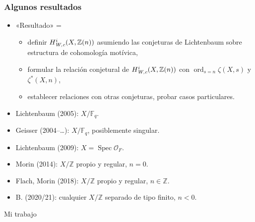\documentclass[handout]{beamer}
\newcommand{\FF}{\mathbb{F}}
\newcommand{\ZZ}{\mathbb{Z}}
\DeclareMathOperator{\ord}{ord}
\DeclareMathOperator{\Spec}{Spec}
\newcommand{\Wc}{\text{\it W,c}}
\begin{document}
\begin{frame}
  \frametitle{Algunos resultados}

  \begin{itemize}
  \item «Resultado» =
    \begin{itemize}
    \item definir $H^i_\Wc (X, \ZZ(n))$ asumiendo las conjeturas de Lichtenbaum
      sobre estructura de cohomología motívica,
    \item formular la relación conjetural de $H^i_\Wc (X, \ZZ(n))$ con
      $\ord_{s=n} \zeta (X,s)$ y $\zeta^* (X,n)$,
    \item establecer relaciones con otras conjeturas, probar casos particulares.
    \end{itemize}

  \item Lichtenbaum (2005): $X/\FF_q$.

  \item Geisser (2004--\dots): $X/\FF_q$, posiblemente singular.

  \item Lichtenbaum (2009): $X = \Spec \mathcal{O}_F$.

  \item Morin (2014): $X/\ZZ$ propio y regular, $n = 0$.

  \item Flach, Morin (2018): $X/\ZZ$ propio y regular, $n \in \ZZ$.

  \item B. (2020/21): cualquier $X/\ZZ$ separado de tipo finito, $n < 0$.
  \end{itemize}
\end{frame}


\begin{frame}[plain]
  \headingfont

  \begin{center}
    {\huge Mi trabajo}
  \end{center}
\end{frame}

\end{document}
